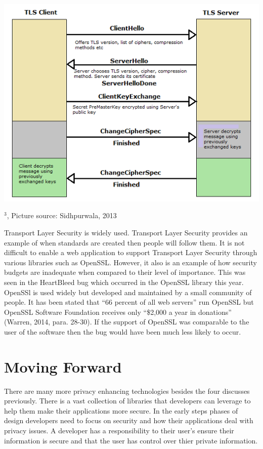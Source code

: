 \documentclass[12pt]{article}
\def\inst#1{$^{#1}$}
\begin{document}
\includegraphics{tls-handshake}
 \begin{center}
{\footnotesize
\inst{3}, Picture source: Sidhpurwala, 2013}
\end{center}

 Transport Layer Security is widely used. Transport Layer Security provides an example of when standards are created then people will follow them. It is not difficult to enable a web application to support Transport Layer Security through various libraries such as OpenSSL. However, it also is an example of how security budgets are inadequate when compared to their level of importance. This was seen in the HeartBleed bug which occurred in the OpenSSL library this year. OpenSSl is used widely but developed and maintained by a small community of people. It has been stated that ``66 percent of all web servers'' run OpenSSL but OpenSSL Software Foundation receives only ``\$2,000 a year in donations'' (Warren, 2014, para. 28-30). If the support of OpenSSL was comparable to the user of the software then the bug would have been much less likely to occur.

\section{Moving Forward}\label{sec:moving-forward}
There are many more privacy enhancing technologies besides the four discusses previously. There is a vast collection of libraries that developers can leverage to help them make their applications more secure. In the early steps phases of design developers need to focus on security and how their applications deal with privacy issues. A developer has a responsibility to their user's ensure their information is secure and that the user has control over thier private information. 
\end{document}
